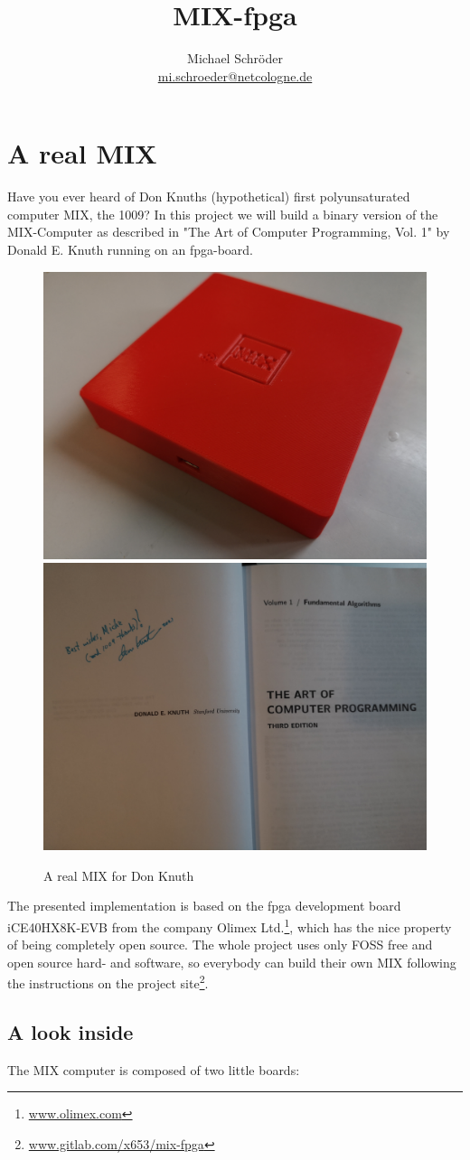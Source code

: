 \documentclass[a4paper,ngerman]{scrartcl}
\title{MIX-fpga}
\author{Michael Schröder \\ \href{mi.schroeder@netcologne.de}{mi.schroeder@netcologne.de}}
\begin{document}
\maketitle

\section{A real MIX}

Have you ever heard of Don Knuths (hypothetical) first polyunsaturated computer MIX, the 1009? In this project we will build a binary version of the MIX-Computer as described in "The Art of Computer Programming, Vol. 1" by Donald E. Knuth running on an fpga-board.

\begin{figure}
	\centering
	\includegraphics[width=0.45\linewidth]{MIX_real.jpg}
	\includegraphics[width=0.45\linewidth]{taocp.jpg}
	\caption{A real MIX for Don Knuth}
	\label{fig:mixtoast}
\end{figure}

The presented implementation is based on the fpga development board iCE40HX8K-EVB from the company Olimex Ltd.\footnote{\href{www.olimex.com}{www.olimex.com}}, which has the nice property of being completely open source. The whole project uses only FOSS free and open source hard- and software, so everybody can build their own MIX following the instructions on the project site\footnote{\href{www.gitlab.com/x653/mix-fpga}{www.gitlab.com/x653/mix-fpga}}.

\subsection{A look inside}
The MIX computer is composed of two little boards:
\end{document}
